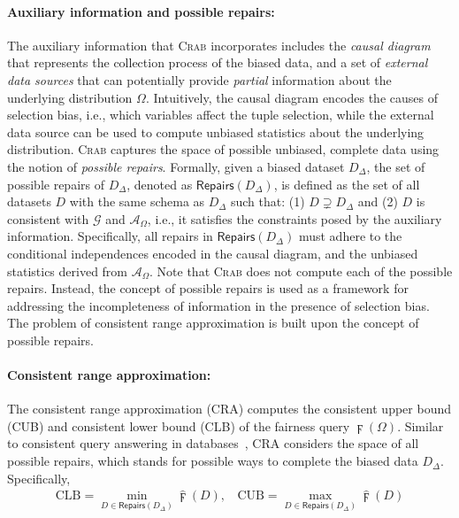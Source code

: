 \documentclass[11pt]{article}
\newcommand{\popul}{\Delta}
\newcommand{\underlyingDist}{\Omega}
\newcommand{\repairs}{\ensuremath{\mathsf{Repairs}}\xspace}
\newcommand{\auxdata}{\mathcal{A}_{\underlyingDist}}
\newcommand{\lowerbound}{{\text{CLB}}}
\newcommand{\upperbound}{\text{CUB}}
\newcommand{\bcdag}{\mathcal{G}}
\newcommand{\bdata}{D_{\popul}}
\newcommand{\sCondDemoParityDist}[1]{\digamma(#1)}
\newcommand{\crab}{\textsc{Crab}\xspace}
\begin{document}
{\paragraph{Auxiliary information and possible repairs:}
The auxiliary information that \crab incorporates includes the {\em causal diagram} that represents the collection process of the biased data, and a set of {\em external data sources} that can potentially provide {\em partial} information about the underlying distribution $\underlyingDist$.
Intuitively, the causal diagram encodes the causes of selection bias, i.e., which variables affect the tuple selection, while the external data source can be used to compute unbiased statistics about the underlying distribution.
\crab captures the space of possible unbiased, complete data using the notion of {\em possible repairs}.
Formally, given a biased dataset $\bdata$, the set of possible repairs of $\bdata$, denoted as $\repairs(\bdata)$, is defined as the set of all datasets $D$ with the same schema as $\bdata$ such that: (1) $D \supsetneq \bdata$ and (2) $D$ is consistent with $\bcdag$ and $\auxdata$, i.e., it satisfies the constraints posed by the auxiliary information.
Specifically, all repairs in $\repairs(\bdata)$ must adhere to the conditional independences encoded in the causal diagram, and the unbiased statistics derived from $\auxdata$.
Note that \crab does not compute each of the possible repairs. Instead, the concept of possible repairs is used as a framework for addressing the incompleteness of information in the presence of selection bias. The problem of consistent range approximation is built upon the concept of possible repairs.
}


\vspace{-.3cm}
\paragraph{Consistent range approximation:}
The consistent range approximation (CRA) computes the consistent upper bound (CUB) and consistent lower bound (CLB) of the fairness query $\sCondDemoParityDist{\Omega}$.
Similar to consistent query answering in databases~\cite{bertossi2006consistent,dixit2021consistent}, CRA considers the space of all possible repairs, which stands for possible ways to complete the biased data $D_\Delta$. Specifically, 
\vspace{-.15cm}
{\small
\begin{align*}
    \lowerbound = \min_{D\in \repairs(\bdata)} \hat{\digamma} (D), ~~~~\upperbound=\max_{D\in \repairs(\bdata)} \hat{\digamma} (D)
\end{align*}
}
\vspace{-.35cm}
\end{document}
